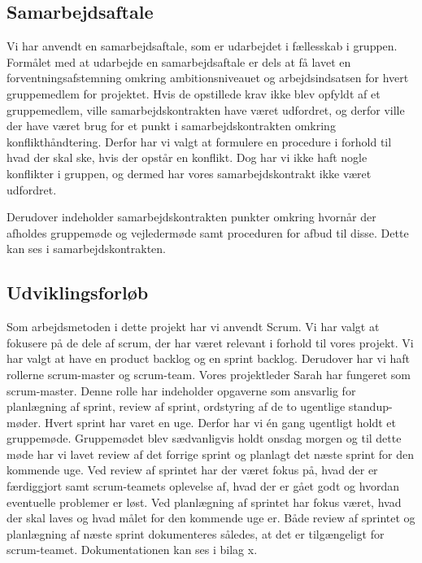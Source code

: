 \subsection{Samarbejdsaftale}
Vi har anvendt en samarbejdsaftale, som er udarbejdet i fællesskab i gruppen. Formålet med at udarbejde en samarbejdsaftale er dels at få lavet en forventningsafstemning omkring ambitionsniveauet og arbejdsindsatsen for hvert gruppemedlem for projektet. Hvis de opstillede krav ikke blev opfyldt af et gruppemedlem, ville samarbejdskontrakten have været udfordret, og derfor ville der have været brug for et punkt i samarbejdskontrakten omkring konflikthåndtering. Derfor har vi valgt at formulere en procedure i forhold til hvad der skal ske, hvis der opstår en konflikt. Dog har vi ikke haft nogle konflikter i gruppen, og dermed har vores samarbejdskontrakt ikke været udfordret. 

Derudover indeholder samarbejdskontrakten punkter omkring hvornår der afholdes gruppemøde og vejledermøde samt proceduren for afbud til disse. Dette kan ses i samarbejdskontrakten. 


\subsection{Udviklingsforløb}\label{sec:udvikling}
Som arbejdsmetoden i dette projekt har vi anvendt Scrum. Vi har valgt at fokusere på de dele af scrum, der har været relevant i forhold til vores projekt. Vi har valgt at have en product backlog og en sprint backlog. Derudover har vi haft rollerne scrum-master og scrum-team. Vores projektleder Sarah har fungeret som scrum-master. Denne rolle har indeholder opgaverne som ansvarlig for planlægning af sprint, review af sprint, ordstyring af de to ugentlige standup-møder. Hvert sprint har varet en uge. Derfor har vi én gang ugentligt holdt et gruppemøde. Gruppemødet blev sædvanligvis holdt onsdag morgen og til dette møde har vi lavet review af det forrige sprint og planlagt det næste sprint for den kommende uge. Ved review af sprintet har der været fokus på, hvad der er færdiggjort samt scrum-teamets oplevelse af, hvad der er gået godt og hvordan eventuelle problemer er løst. Ved planlægning af sprintet har fokus været, hvad der skal laves og hvad målet for den kommende uge er. Både review af sprintet og planlægning af næste sprint dokumenteres således, at det er tilgængeligt for scrum-teamet. Dokumentationen kan ses i bilag x.

